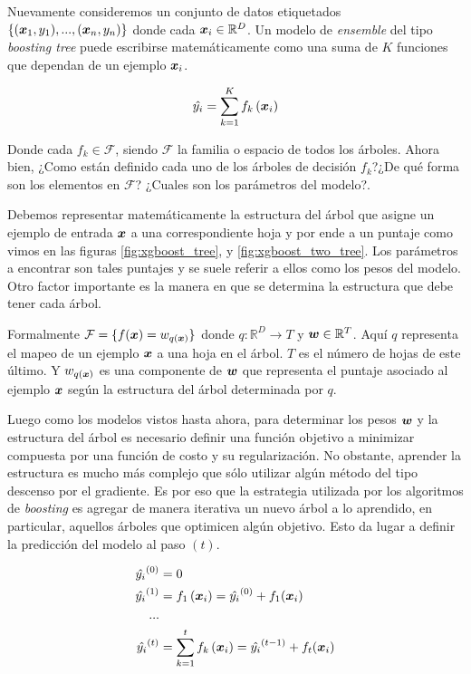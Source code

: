 Nuevamente consideremos un conjunto de datos etiquetados $\{(\boldsymbol{x}_1, y_1),
..., (\boldsymbol{x}_n, y_n)\}$ donde cada $\boldsymbol{x}_i \in \mathbb{R}^{D}$. Un
modelo de \emph{ensemble} del tipo \emph{boosting tree} puede escribirse
matemáticamente como una suma de $K$ funciones que dependan de un ejemplo
$\boldsymbol{x}_i$.

\begin{equation} \label{eq:xgb-model-1}
    \hat{y_{i}} = \sum_{k=1}^{K} f_{k} \left( \boldsymbol{x}_{i}\right)
\end{equation}

Donde cada $f_k \in \mathcal{F}$, siendo $\mathcal{F}$ la familia o espacio de
todos los árboles. Ahora bien, ¿Como están definido cada uno de los árboles de
decisión $f_k$?¿De qué forma son los elementos en $\mathcal{F}$? ¿Cuales son los
parámetros del modelo?.

Debemos representar matemáticamente la estructura del árbol que asigne un
ejemplo de entrada $\boldsymbol{x}$ a una correspondiente hoja y por ende a un puntaje
como vimos en las figuras \ref{fig:xgboost_tree}, y \ref{fig:xgboost_two_tree}.
Los parámetros a encontrar son tales puntajes y se suele referir a ellos como
los pesos del modelo. Otro factor importante es la manera en que se determina la
estructura que debe tener cada árbol.

Formalmente $\mathcal{F} = \{f(\boldsymbol{x}) = w_{q\left( \boldsymbol{x} \right)}\}$ donde
$q : \mathbb{R}^{D} \rightarrow T$ y $\boldsymbol{w} \in \mathbb{R}^{T}$. Aquí $q$
representa el mapeo de un ejemplo $\boldsymbol{x}$ a una hoja en el árbol. $T$ es el
número de hojas de este último. Y $w_{q\left( \boldsymbol{x} \right)}$ es una
componente de $\boldsymbol{w}$ que representa el puntaje asociado al ejemplo
$\boldsymbol{x}$ según la estructura del árbol determinada por $q$.

Luego como los modelos vistos hasta ahora, para determinar los pesos $\boldsymbol{w}$
y la estructura del árbol es necesario definir una función objetivo a minimizar
compuesta por una función de costo y su regularización. No obstante, aprender la
estructura es mucho más complejo que sólo utilizar algún método del tipo
descenso por el gradiente. Es por eso que la estrategia utilizada por los
algoritmos de \emph{boosting} es agregar de manera iterativa un nuevo árbol a lo
aprendido, en particular, aquellos árboles que optimicen algún objetivo. Esto da
lugar a definir la predicción del modelo al paso $(t)$.

\begin{align*}
    \hat{y_i}^{(0)} &= 0 \\
    \hat{y_i}^{(1)} &= f_{1}\left( \boldsymbol{x}_i \right) = \hat{y_i}^{(0)} + f_1{(\boldsymbol{x}_i)} \\
    ... \\
    \hat{y_i}^{(t)} &= \sum_{k=1}^{t} f_{k} \left( \boldsymbol{x}_{i}\right) = \hat{y_i}^{(t - 1)} + f_t{(\boldsymbol{x}_i)}
\end{align*}

